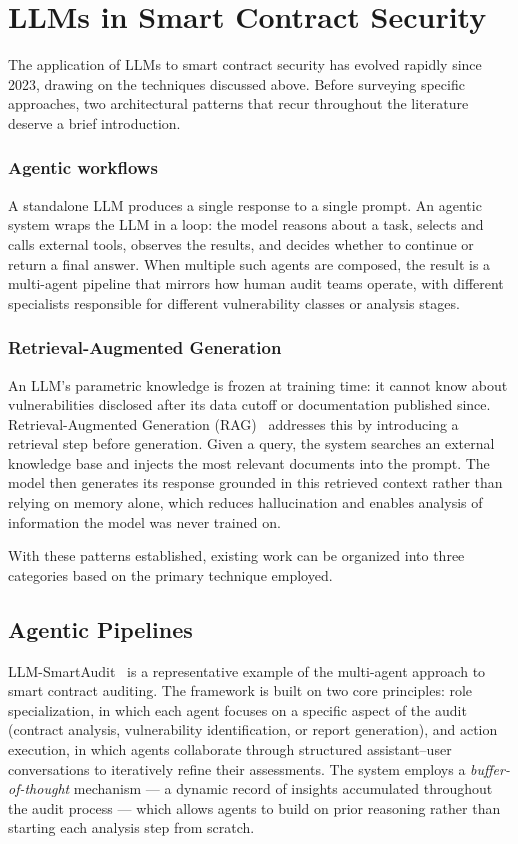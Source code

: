 \section{LLMs in Smart Contract Security}
\label{sec:llm-auditing}

The application of LLMs to smart contract security has evolved rapidly since 2023, drawing on the techniques discussed above. Before surveying specific approaches, two architectural patterns that recur throughout the literature deserve a brief introduction.

\subsubsection*{Agentic workflows}
A standalone LLM produces a single response to a single prompt. An agentic system wraps the LLM in a loop: the model reasons about a task, selects and calls external tools, observes the results, and decides whether to continue or return a final answer. When multiple such agents are composed, the result is a multi-agent pipeline that mirrors how human audit teams operate, with different specialists responsible for different vulnerability classes or analysis stages.

\subsubsection*{Retrieval-Augmented Generation}
An LLM's parametric knowledge is frozen at training time: it cannot know about vulnerabilities disclosed after its data cutoff or documentation published since. Retrieval-Augmented Generation (RAG)~\cite{lewis2021retrieval} addresses this by introducing a retrieval step before generation. Given a query, the system searches an external knowledge base and injects the most relevant documents into the prompt. The model then generates its response grounded in this retrieved context rather than relying on memory alone, which reduces hallucination and enables analysis of information the model was never trained on.

With these patterns established, existing work can be organized into three categories based on the primary technique employed.

\subsection{Agentic Pipelines}
\label{subsec:prompt-only}

LLM-SmartAudit~\cite{wei2024smartaudit} is a representative example of the multi-agent approach to smart contract auditing. The framework is built on two core principles: role specialization, in which each agent focuses on a specific aspect of the audit (contract analysis, vulnerability identification, or report generation), and action execution, in which agents collaborate through structured assistant--user conversations to iteratively refine their assessments. The system employs a \emph{buffer-of-thought} mechanism --- a dynamic record of insights accumulated throughout the audit process --- which allows agents to build on prior reasoning rather than starting each analysis step from scratch.

